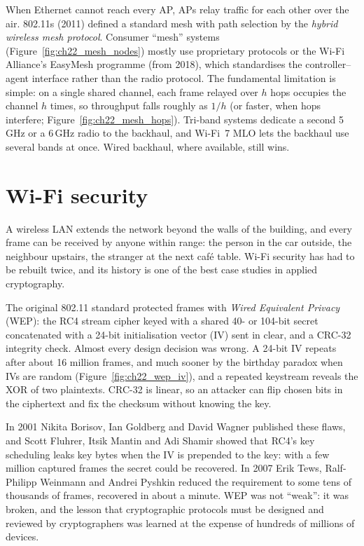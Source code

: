 When Ethernet cannot reach every AP, APs relay traffic for each other over the air. 802.11s (2011)
defined a standard mesh with path selection by the \emph{hybrid wireless mesh protocol}. Consumer
``mesh'' systems (Figure~\ref{fig:ch22_mesh_nodes}) mostly use proprietary protocols or the Wi-Fi
Alliance's EasyMesh programme (from 2018), which standardises the controller--agent interface rather
than the radio protocol. The fundamental limitation is simple: on a single shared channel, each frame
relayed over $h$ hops occupies the channel $h$ times, so throughput falls roughly as $1/h$ (or
faster, when hops interfere; Figure~\ref{fig:ch22_mesh_hops}). Tri-band systems dedicate a second
5\,GHz or a 6\,GHz radio to the backhaul, and Wi-Fi~7 MLO lets the backhaul use several bands at
once. Wired backhaul, where available, still wins.

\section{Wi-Fi security}
\label{sec:ch22:security}

A wireless LAN extends the network beyond the walls of the building, and every frame can be
received by anyone within range: the person in the car outside, the neighbour upstairs, the stranger
at the next café table. Wi-Fi security has had to be rebuilt twice, and its history is one of the
best case studies in applied cryptography.


\begin{history}
The original 802.11 standard protected frames with \emph{Wired Equivalent Privacy} (WEP): the RC4
stream cipher keyed with a shared 40- or 104-bit secret concatenated with a 24-bit initialisation
vector (IV) sent in clear, and a CRC-32 integrity check. Almost every design decision was wrong. A
24-bit IV repeats after about 16 million frames, and much sooner by the birthday paradox when IVs are
random (Figure~\ref{fig:ch22_wep_iv}), and a repeated keystream reveals the XOR of two plaintexts.
CRC-32 is linear, so an attacker can flip chosen bits in the ciphertext and fix the checksum without
knowing the key.

In 2001 Nikita Borisov, Ian Goldberg and David Wagner published these flaws, and Scott Fluhrer,
Itsik Mantin and Adi Shamir showed that RC4's key scheduling leaks key bytes when the IV is prepended
to the key: with a few million captured frames the secret could be recovered. In 2007 Erik Tews,
Ralf-Philipp Weinmann and Andrei Pyshkin reduced the requirement to some tens of thousands of frames,
recovered in about a minute. WEP was not ``weak'': it was broken, and the lesson that cryptographic
protocols must be designed and reviewed by cryptographers was learned at the expense of hundreds of
millions of devices.
\end{history}

